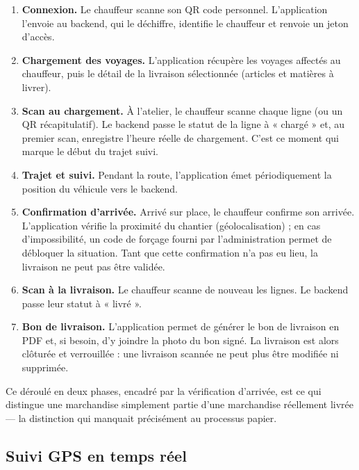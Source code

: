 \documentclass[12pt,a4paper]{report}
\begin{document}
\begin{enumerate}
\item \textbf{Connexion.} Le chauffeur scanne son QR code personnel. L'application l'envoie au backend, qui le déchiffre, identifie le chauffeur et renvoie un jeton d'accès.

\item \textbf{Chargement des voyages.} L'application récupère les voyages affectés au chauffeur, puis le détail de la livraison sélectionnée (articles et matières à livrer).

\item \textbf{Scan au chargement.} À l'atelier, le chauffeur scanne chaque ligne (ou un QR récapitulatif). Le backend passe le statut de la ligne à « chargé » et, au premier scan, enregistre l'heure réelle de chargement. C'est ce moment qui marque le début du trajet suivi.

\item \textbf{Trajet et suivi.} Pendant la route, l'application émet périodiquement la position du véhicule vers le backend.

\item \textbf{Confirmation d'arrivée.} Arrivé sur place, le chauffeur confirme son arrivée. L'application vérifie la proximité du chantier (géolocalisation) ; en cas d'impossibilité, un code de forçage fourni par l'administration permet de débloquer la situation. Tant que cette confirmation n'a pas eu lieu, la livraison ne peut pas être validée.

\item \textbf{Scan à la livraison.} Le chauffeur scanne de nouveau les lignes. Le backend passe leur statut à « livré ».

\item \textbf{Bon de livraison.} L'application permet de générer le bon de livraison en PDF et, si besoin, d'y joindre la photo du bon signé. La livraison est alors clôturée et verrouillée : une livraison scannée ne peut plus être modifiée ni supprimée.
\end{enumerate}

Ce déroulé en deux phases, encadré par la vérification d'arrivée, est ce qui distingue une marchandise simplement partie d'une marchandise réellement livrée — la distinction qui manquait précisément au processus papier.

\subsection{Suivi GPS en temps réel}
\end{document}
